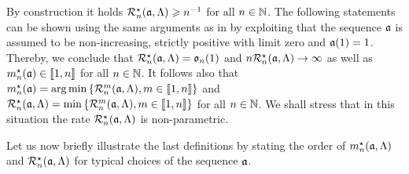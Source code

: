 \begin{rmk}\label{oo:rem:mra}
By construction it holds 
$\mnRa{\xdfCw[],\Lambda}\geq \ssY^{-1}$ for all $\ssY\in\Nz$.
The following statements can be
shown using the same arguments as in 
by exploiting that the sequence $\xdfCw[]$ is assumed to be
non-increasing, strictly positive with limit zero and $\xdfCw[(1)]=1$. 
Thereby, we conclude that 
$\mnRa{\xdfCw[],\Lambda}=\mathfrak{o}_{n}(1)$ and $\ssY\mnRa{\xdfCw[],\Lambda}\to\infty$ as well as 
$\mnDi(\xdfCw[])\in\nset{1,\ssY}$ for all $\ssY\in\Nz$. It follows also that
$\mnDi(\xdfCw[])=\argmin\Nset[{\Di\in\nset{1,n}}]{\dRa{\Di}{\xdfCw[],\Lambda}}$ and 
$\mnRa{\xdfCw[],\Lambda}=\min\Nset[{\Di\in\nset{1,n}}]{\dRa{\Di}{\xdfCw[],\Lambda}}$ for all
$\ssY\in\Nz$. We shall stress that in this situation the rate
$\mnRa{\xdfCw[],\Lambda}$ is non-parametric. \remEnd
\end{rmk}


Let us now briefly illustrate the last definitions by stating the
order of $\mnDi(\xdfCw[],\Lambda)$ and $\mnRa{\xdfCw[],\Lambda}$ for typical choices of the
sequence $\xdfCw[]$.

